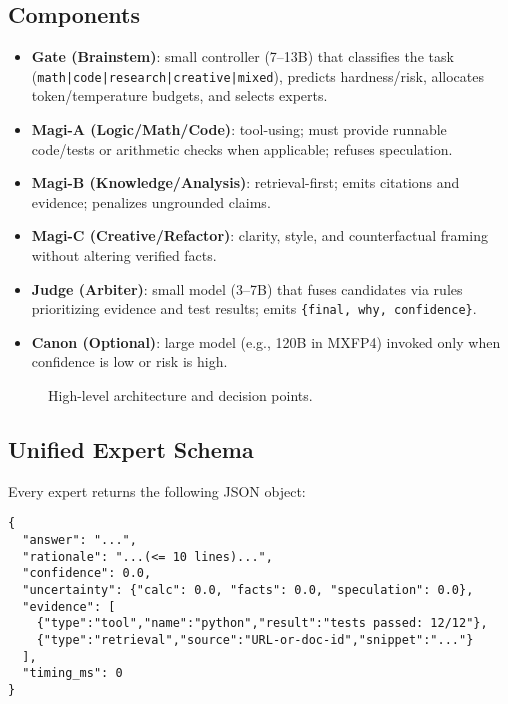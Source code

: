 \documentclass[11pt]{article}
\begin{document}
\subsection{Components}
\begin{itemize}[leftmargin=*, itemsep=3pt]
  \item \textbf{Gate (Brainstem)}: small controller (7--13B) that classifies the task (\texttt{math|code|research|creative|mixed}), predicts hardness/risk, allocates token/temperature budgets, and selects experts.
  \item \textbf{Magi-A (Logic/Math/Code)}: tool-using; must provide runnable code/tests or arithmetic checks when applicable; refuses speculation.
  \item \textbf{Magi-B (Knowledge/Analysis)}: retrieval-first; emits citations and evidence; penalizes ungrounded claims.
  \item \textbf{Magi-C (Creative/Refactor)}: clarity, style, and counterfactual framing without altering verified facts.
  \item \textbf{Judge (Arbiter)}: small model (3--7B) that fuses candidates via rules prioritizing evidence and test results; emits \texttt{\{final, why, confidence\}}.
  \item \textbf{Canon (Optional)}: large model (e.g., 120B in MXFP4) invoked only when confidence is low or risk is high.
\end{itemize}

\begin{figure}[t]
\centering
{}
\caption{High-level architecture and decision points.}
\end{figure}

\subsection{Unified Expert Schema}
Every expert returns the following JSON object:
\begin{lstlisting}
{
  "answer": "...",
  "rationale": "...(<= 10 lines)...",
  "confidence": 0.0,
  "uncertainty": {"calc": 0.0, "facts": 0.0, "speculation": 0.0},
  "evidence": [
    {"type":"tool","name":"python","result":"tests passed: 12/12"},
    {"type":"retrieval","source":"URL-or-doc-id","snippet":"..."}
  ],
  "timing_ms": 0
}
\end{lstlisting}
\end{document}
